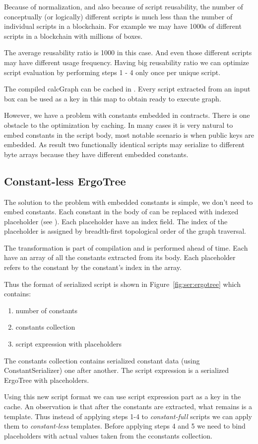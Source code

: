 Because of normalization, and also because of script reusability, the number
of conceptually (or logically) different scripts is much less than the number
of individual scripts in a blockchain. For example we may have 1000s of
different scripts in a blockchain with millions of boxes.

The average reusability ratio is 1000 in this case. And even those different
scripts may have different usage frequency. Having big reusability ratio we
can optimize script evaluation by performing steps 1 - 4 only once per unique
script.

The compiled calcGraph can be cached in . Every script extracted from an input box can be used as a key
in this map to obtain ready to execute graph.

However, we have a problem with constants embedded in contracts. There is one
obstacle to the optimization by caching. In many cases it is very natural to
embed constants in the script body, most notable scenario is when public keys
are embedded. As result two functionally identical scripts may serialize to
different byte arrays because they have different embedded constants.

\subsection{Constant-less ErgoTree}

The solution to the problem with embedded constants is simple, we don't need
to embed constants. Each constant in the body of \ASDag can be replaced
with indexed placeholder (see \hyperref[sec:appendix:primops:ConstantPlaceholder]{}).
Each placeholder have an index field. The index of the placeholder is
assigned by breadth-first topological order of the graph traversal.

The transformation is part of compilation and is performed ahead of time.
Each \ASDag have an array of all the constants extracted from its body. Each
placeholder refers to the constant by the constant's index in the array.

Thus the format of serialized script is shown in Figure~\ref{fig:ser:ergotree} which contains:
\begin{enumerate}
    \item number of constants
    \item constants collection
    \item script expression with placeholders
\end{enumerate}

The constants collection contains serialized constant data (using
ConstantSerializer) one after another.
The script expression is a serialized ErgoTree with placeholders.

Using this new script format we can use script expression part as a key in
the cache. An observation is that after the constants are extracted, what
remains is a template. Thus instead of applying steps 1-4 to
\emph{constant-full} scripts we can apply them to \emph{constant-less}
templates. Before applying steps 4 and 5 we need to bind placeholders with
actual values taken from the cconstants collection.